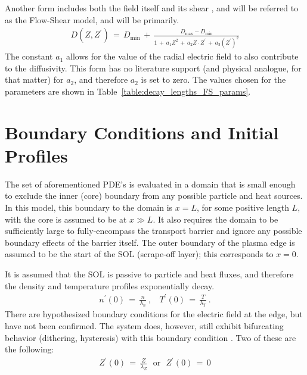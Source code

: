 Another form includes both the field itself and its shear \cite{paquay_studying_2012}, and will be referred to as the Flow-Shear model, and will be primarily.
\begin{align} %
	D(Z, Z^{\prime}) \,=\, D_\text{min} \,+\,
		\frac{D_\text{max} - D_\text{min}}{1 \,+\, a_1 Z^2 \,+\,
		a_2 Z \cdot Z^{\prime} \,+\, a_3 (Z^{\prime})^2}
		\label{eq:flow_shear_diffusivity}
\end{align}
The constant $a_1$ allows for the value of the radial electric field to also contribute to the diffusivity.
This form has no literature support (and physical analogue, for that matter) for $a_2$, and therefore $a_2$ is set to zero.
The values chosen for the parameters are shown in Table~\ref{table:decay_lengths_FS_params}.

\section{Boundary Conditions and Initial Profiles}\label{sec:boundary_conditions}
The set of aforementioned PDE's is evaluated in a domain that is small enough to exclude the inner (core) boundary from any possible particle and heat sources.
In this model, this boundary to the domain is $x = L$, for some positive length $L$, with the core is assumed to be at $x \gg L$.
It also requires the domain to be sufficiently large to fully-encompass the transport barrier and ignore any possible boundary effects of the barrier itself.
The outer boundary of the plasma edge is assumed to be the start of the SOL (scrape-off layer); this corresponds to $x = 0$.

It is assumed that the SOL is passive to particle and heat fluxes, and therefore the density and temperature profiles exponentially decay.
\begin{align} %
	n^\prime(0) \,=\, \frac{n}{\lambda_n}~, ~~~~
		T^\prime(0) \,=\, \frac{T}{\lambda_T}~. \label{eq:SOL_boundary}
\end{align}
There are hypothesized boundary conditions for the electric field at the edge, but have not been confirmed.
The system does, however, still exhibit bifurcating behavior (dithering, hysteresis) with this boundary condition \cite{paquay_studying_2012}.
Two of these are the following:
\begin{align} %
	Z^\prime(0) \,=\, \frac{Z}{\lambda_Z} ~~~ \text{or} ~~~ Z^\prime(0) \,=\,
		0 \label{eq:Z_edge_conds}
\end{align}

